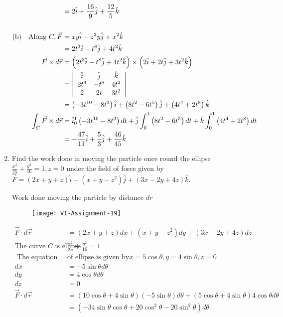 \begin{enumerate}
\begin{answer}
\begin{align*}
	&=2 \hat{i}+\frac{16}{9} \hat{j}+\frac{12}{5} \hat{k}\\\\
	\text{(b)\quad Along }C, \vec{F}&=x y \hat{i}-z^{2} y \hat{j}+x^{2} \hat{k}\\
	&=2 t^{3} \hat{i}-t^{8} \hat{j}+4 t^{2} \hat{k} \\
	\vec{F} \times d \vec{r} &=\left(2 t^{3} \hat{i}-t^{8} \hat{j}+4 t^{2} \hat{k}\right) \times\left(2 \hat{i}+2 t \hat{j}+3 t^{2} \hat{k}\right) \\
	&=\left|\begin{array}{ccc}
	\hat{i} & \hat{j} & \hat{k} \\
	2 t^{3} & -t^{8} & 4 t^{2} \\
	2 & 2 t & 3 t^{2}
	\end{array}\right| \\
	&=\left(-3 t^{10}-8 t^{3}\right) \hat{i}+\left(8 t^{2}-6 t^{5}\right) \hat{j}+\left(4 t^{4}+2 t^{8}\right) \hat{k} \\
	\int_{C} \vec{F} \times d \vec{r} &=\hat{i}_{0}^{1}\left(-3 t^{10}-8 t^{3}\right) d t+\hat{j} \int_{0}^{1}\left(8 t^{2}-6 t^{5}\right) d t+\hat{k} \int_{0}^{1}\left(4 t^{4}+2 t^{8}\right) d t \\
	&=-\frac{47}{11} \hat{i}+\frac{5}{3} \hat{j}+\frac{46}{45} \hat{k}
	\end{align*}
\end{answer}
\item Find the work done in moving the particle once round the ellipse $\frac{x^{2}}{25}+\frac{y^{2}}{16}=1, z=0$ under the field of force given by $\vec{F}=(2 x+y+z) \hat{i}+\left(x+y-z^{2}\right) \hat{j}+(3 x-2 y+4 z) \hat{k}$.
\begin{answer}
		Work done moving the particle by distance $d r$
		\begin{figure}[H]
			\centering
			\texttt{[image: VI-Assignment-19]}
		\end{figure}
	\begin{align*}
	\vec{F} \cdot d \vec{r}&=(2 x+y+z) d x+\left(x+y-z^{2}\right) d y+(3 x-2 y+4 z) d z\\
	\text{The curve $C$ is ellipse }&\frac{x^{2}}{25}+\frac{y^{2}}{16}=1\\
\text{	The equation  }&\text{of ellipse is given by}x=5 \cos \theta, y=4 \sin \theta, z=0\\
d x &=-5 \sin \theta d \theta \\ d y &=4 \cos \theta d \theta \\ d z &=0 \\ \vec{F} \cdot d \vec{r} &=(10 \cos \theta+4 \sin \theta)(-5 \sin \theta) d \theta+(5 \cos \theta+4 \sin \theta) 4 \cos \theta d \theta \\ &=\left(-34 \sin \theta \cos \theta+20 \cos ^{2} \theta-20 \sin ^{2} \theta\right) d \theta 

\end{align*}
\end{answer}
\end{enumerate}
